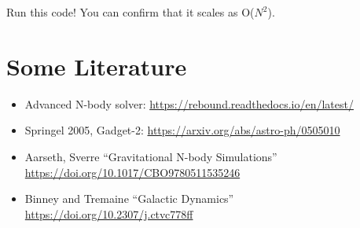 \documentclass[12pt]{article}
\begin{document}
Run this code! You can confirm that it scales as O($N^2$).

\section{Some Literature}
\begin{itemize}

\item Advanced N-body solver: \url{https://rebound.readthedocs.io/en/latest/}

\item Springel 2005, Gadget-2: \url{https://arxiv.org/abs/astro-ph/0505010}

\item Aarseth, Sverre ``Gravitational N-body Simulations'' \url{https://doi.org/10.1017/CBO9780511535246}

\item Binney and Tremaine ``Galactic Dynamics'' \url{https://doi.org/10.2307/j.ctvc778ff}
\end{itemize}
\end{document}
